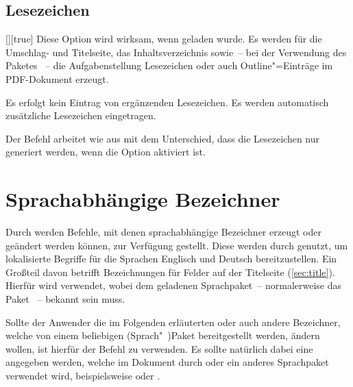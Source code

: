 \begin{Declaration*}{}
\begin{Declaration*}{}
\begin{Declaration*}{}
\subsection{Lesezeichen}
\begin{Declaration}{[\PBoolean]}[true]%
\printdeclarationlist%
%
%
%
%
%
%
%
%
Diese Option wird wirksam, wenn  geladen wurde. Es werden für 
die Umschlag- und Titelseite, das Inhaltsverzeichnis sowie~-- bei der 
Verwendung des Paketes ~-- die Aufgabenstellung 
Lesezeichen oder auch Outline"=Einträge im PDF-Dokument erzeugt.
%
\begin{values}
\itemfalse
  Es erfolgt kein Eintrag von ergänzenden Lesezeichen.
\itemtrue*
  Es werden automatisch zusätzliche Lesezeichen eingetragen.
\end{values}
\end{Declaration}

\begin{Declaration}{%
}%
\printdeclarationlist%
%
Der Befehl  arbeitet wie  aus 
 mit dem Unterschied, dass die Lesezeichen nur generiert 
werden, wenn die Option  aktiviert ist.
\end{Declaration}



\section{Sprachabhängige Bezeichner}
\label{sec:localization}
%
%
%
Durch \KOMAScript{} werden Befehle, mit denen sprachabhängige Bezeichner 
erzeugt oder geändert werden können, zur Verfügung gestellt. Diese werden durch 
\TUDScript genutzt, um lokalisierte Begriffe für die Sprachen Englisch und 
Deutsch bereitzustellen. Ein Großteil davon betrifft Bezeichnungen für Felder 
auf der Titelseite (\autoref{sec:title}). Hierfür wird
verwendet, wobei  dem geladenen Sprachpaket~-- normalerweise das 
Paket ~-- bekannt sein muss.

Sollte der Anwender die im Folgenden erläuterten oder auch andere Bezeichner, 
welche von einem beliebigen (Sprach"~)Paket bereitgestellt werden, ändern 
wollen, ist hierfür der Befehl
zu verwenden. Es sollte natürlich dabei eine  angegeben werden, 
welche im Dokument durch  oder ein anderes Sprachpaket verwendet 
wird, beispielsweise  oder . 


\end{Declaration*}
\end{Declaration*}
\end{Declaration*}
